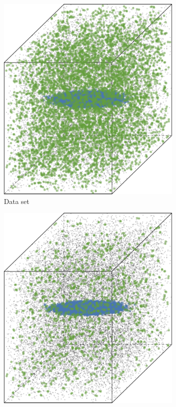 \begin{figure}
\begin{subfigure}{0.23\textwidth}
				\includegraphics[keepaspectratio=true, width=\textwidth, height=0.23\textheight]{discussion/img/baakman_1_abs_error_mbeSmallerThansambe}
				\caption{Data set \baakmanOne}
				\label{fig:discussion:performance:mbeLowerError:baakman1}
			\end{subfigure}
			\subfigvspace
			\begin{subfigure}{0.23\textwidth}
				\centering
				\includegraphics[keepaspectratio=true, width=\textwidth, height=0.23\textheight]{discussion/img/baakman_4_abs_error_mbeSmallerThansambe}

\end{subfigure}
\end{figure}
